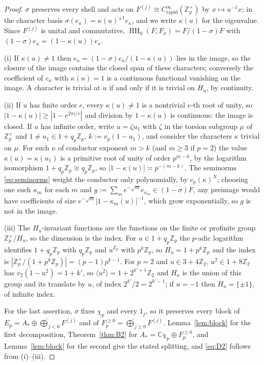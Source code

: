 \documentclass[11pt]{amsart}
\theoremstyle{definition}
\theoremstyle{remark}
\newcommand{\C}{\mathbb C}
\newcommand{\Z}{\mathbb Z}
\newcommand{\HH}{\operatorname{HH}}
\begin{document}
\begin{proof}
$\sigma$ preserves every shell and acts on $F^{(j)}\cong
C^{\infty}_{\mathrm{rapid}}(\Z_p^{\times})$ by $x\mapsto u^{-1}x$; in the
character basis $\sigma(e_{\kappa})=\kappa(u)^{\pm1}e_{\kappa}$, and we write
$\kappa(u)$ for the eigenvalue.  Since $F^{(j)}$ is unital and commutative,
$\HH_0(F,F_{\sigma})=F/(1-\sigma)F$ with
$(1-\sigma)e_{\kappa}=(1-\kappa(u))e_{\kappa}$.

(i) If $\kappa(u)\ne1$ then $e_{\kappa}=(1-\sigma)e_{\kappa}/(1-\kappa(u))$ lies
in the image, so the closure of the image contains the closed span of these
characters; conversely the coefficient of $e_{\kappa}$ with $\kappa(u)=1$ is a
continuous functional vanishing on the image.  A character is trivial at $u$
if and only if it is trivial on $H_u$, by continuity.

(ii) If $u$ has finite order $e$, every $\kappa(u)\ne1$ is a nontrivial $e$-th
root of unity, so $|1-\kappa(u)|\ge|1-e^{2\pi i/e}|$ and division by
$1-\kappa(u)$ is continuous: the image is closed.  If $u$ has infinite order,
write $u=\zeta u_1$ with $\zeta$ in the torsion subgroup $\mu$ of
$\Z_p^{\times}$ and $1\ne u_1\in1+q_p\Z_p$, $k:=v_p(1-u_1)$, and consider the
characters $\kappa$ trivial on $\mu$.  For such $\kappa$ of conductor exponent
$m>k$ (and $m\ge3$ if $p=2$) the value $\kappa(u)=\kappa(u_1)$ is a primitive
root of unity of order $p^{m-k}$, by the logarithm isomorphism
$1+q_p\Z_p\cong q_p\Z_p$, so $|1-\kappa(u)|\asymp p^{-(m-k)}$.
The seminorms \eqref{eq:seminorms} weight the conductor only polynomially,
by $c_p(\kappa)^{N}$; choosing one such $\kappa_m$ for each $m$ and
$g:=\sum_m e^{-\sqrt m}e_{\kappa_m}\in\overline{(1-\sigma)F}$, any preimage
would have coefficients of size $e^{-\sqrt m}|1-\kappa_m(u)|^{-1}$, which grow
exponentially, so $g$ is not in the image.

(iii) The $H_u$-invariant functions are the functions on the finite or
profinite group $\Z_p^{\times}/H_u$, so the dimension is the index.  For
$u\in1+q_p\Z_p$ the $p$-adic logarithm identifies $1+q_p\Z_p$ with
$q_p\Z_p$ and $u^{\Z_p}$ with $p^{k}\Z_p$, so $H_u=1+p^{k}\Z_p$ and the index is
$|\Z_p^{\times}/(1+p^{k}\Z_p)|=(p-1)p^{k-1}$.  For $p=2$ and $u\in3+4\Z_2$,
$u^{2}\in1+8\Z_2$ has $v_2(1-u^{2})=1+k'$, so
$\overline{\langle u^{2}\rangle}=1+2^{k'+1}\Z_2$ and $H_u$ is the union of this
group and its translate by $u$, of index $2^{k'}/2=2^{k'-1}$; if $u=-1$ then
$H_u=\{\pm1\}$, of infinite index.

For the last assertion, $\sigma$ fixes $\chi_p$ and every $1_j$, so it preserves
every block of $E_p=A_*\oplus\widehat\bigoplus_{j<0}F^{(j)}$ and of
$F_p^{\ge0}=\widehat\bigoplus_{j\ge0}F^{(j)}$.  Lemma~\ref{lem:block} for the
first decomposition, Theorem~\ref{thm:B2} for $A_*=\C\chi_p\oplus F_p^{\ge0}$,
and Lemma~\ref{lem:block} for the second give the stated splitting, and
\eqref{eq:D2} follows from (i)--(iii).
\end{proof}
\end{document}
